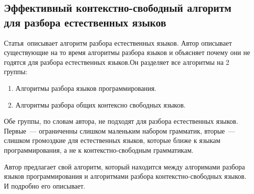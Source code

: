 \subsection{Эффективный контекстно-свободный алгоритм для разбора естественных языков} \label{subsection_Tomita1985}
Статья\,\cite{Tomita1985} описывает алгоритм разбора естественных языков. Автор описывает существующие на то время алгоритмы разбора языков и объясняет почему они не годятся для разбора естественных языков.Он разделяет все алгоритмы на 2 группы:
\begin{enumerate} 
\item{Алгоритмы разбора языков программирования.}
\item{Алгоритмы разбора общих контексно свободных языков.}
\end{enumerate}

Обе группы, по словам автора, не подходят для разбора естественных языков. Первые~--- ограниченны слишком маленьким набором грамматик, вторые~--- слишком громоздкие для естественных языков, которые ближе к языкам программирования, а не к контекстно-свободным грамматикам.

Автор предлагает свой алгоритм, который находится между алгоримами разбора языков программирования и алгоритмами разбора контекстно-свободных языков. И подробно его описывает. 


